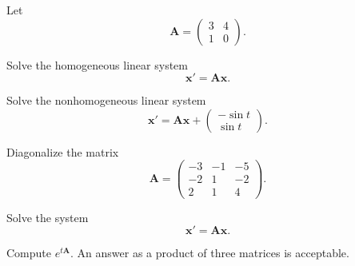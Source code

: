 \documentclass[11pt,oneside]{article}
\begin{document}
\begin{problem}
Let
\[
\mathbf A=
\begin{pmatrix}
3&4\\
1&0
\end{pmatrix}.
\]
\begin{problemsubparts}
\item Solve the homogeneous linear system
\[
\mathbf x'=\mathbf A\mathbf x.
\]
\item Solve the nonhomogeneous linear system
\[
\mathbf x'=\mathbf A\mathbf x+
\begin{pmatrix}
-\sin t\\
\sin t
\end{pmatrix}.
\]
\end{problemsubparts}
\end{problem}

\begin{problem}
Diagonalize the matrix
\[
\mathbf A=
\begin{pmatrix}
-3&-1&-5\\
-2&1&-2\\
2&1&4
\end{pmatrix}.
\]
\begin{problemsubparts}
\item Solve the system
\[
\mathbf x'=\mathbf A\mathbf x.
\]
\item Compute $e^{t\mathbf A}$. An answer as a product of three matrices is acceptable.
\end{problemsubparts}
\end{problem}
\end{document}
